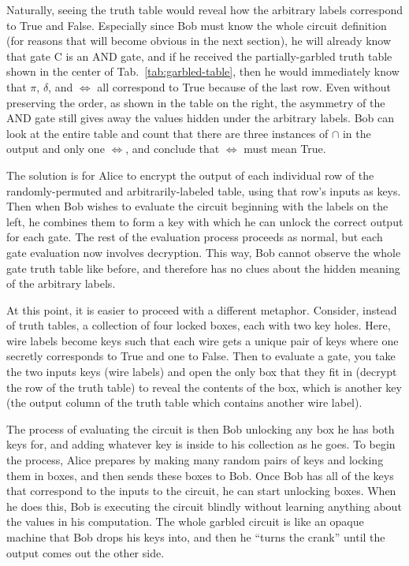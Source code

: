 Naturally, seeing the truth table would reveal how the arbitrary labels correspond to True and False. Especially since Bob must know the whole circuit definition (for reasons that will become obvious in the next section), he will already know that gate C is an AND gate, and if he received the partially-garbled truth table shown in the center of Tab.~\ref{tab:garbled-table}, then he would immediately know that $\pi$, $\delta$, and $\Leftrightarrow$ all correspond to True because of the last row. Even without preserving the order, as shown in the table on the right, the asymmetry of the AND gate still gives away the values hidden under the arbitrary labels. Bob can look at the entire table and count that there are three instances of $\cap$ in the output and only one $\Leftrightarrow$, and conclude that $\Leftrightarrow$ must mean True.

The solution is for Alice to encrypt the output of each individual row of the randomly-permuted and arbitrarily-labeled table, using that row's inputs as keys. Then when Bob wishes to evaluate the circuit beginning with the labels on the left, he combines them to form a key with which he can unlock the correct output for each gate. The rest of the evaluation process proceeds as normal, but each gate evaluation now involves decryption. This way, Bob cannot observe the whole gate truth table like before, and therefore has no clues about the hidden meaning of the arbitrary labels.

At this point, it is easier to proceed with a different metaphor. Consider, instead of truth tables, a collection of four locked boxes, each with two key holes. Here, wire labels become keys such that each wire gets a unique pair of keys where one secretly corresponds to True and one to False. Then to evaluate a gate, you take the two inputs keys (wire labels) and open the only box that they fit in (decrypt the row of the truth table) to reveal the contents of the box, which is another key (the output column of the truth table which contains another wire label).

The process of evaluating the circuit is then Bob unlocking any box he has both keys for, and adding whatever key is inside to his collection as he goes. To begin the process, Alice prepares by making many random pairs of keys and locking them in boxes, and then sends these boxes to Bob. Once Bob has all of the keys that correspond to the inputs to the circuit, he can start unlocking boxes. When he does this, Bob is executing the circuit blindly without learning anything about the values in his computation. The whole garbled circuit is like an opaque machine that Bob drops his keys into, and then he ``turns the crank'' until the output comes out the other side.

